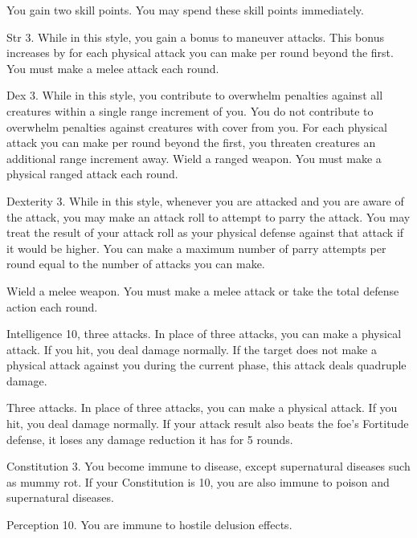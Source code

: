 \featben You gain two skill points.
You may spend these skill points immediately.

\featpre Str 3.
\featben While in this style, you gain a  bonus to maneuver attacks.
This bonus increases by  for each physical attack you can make per round beyond the first.
\stylereq You must make a melee attack each round.

\featpre Dex 3.
\featben While in this style, you contribute to overwhelm penalties against all creatures within a single range increment of you.
You do not contribute to overwhelm penalties against creatures with cover from you.
For each physical attack you can make per round beyond the first, you threaten creatures an additional range increment away.
\stylereq Wield a ranged weapon.
You must make a physical ranged attack each round.

\featpre Dexterity 3.
\featben While in this style, whenever you are attacked and you are aware of the attack, you may make an attack roll to attempt to parry the attack.
You may treat the result of your attack roll as your physical defense against that attack if it would be higher.
You can make a maximum number of parry attempts per round equal to the number of attacks you can make.

\stylereq Wield a melee weapon.
You must make a melee attack or take the total defense action each round.

\featpre Intelligence 10, three attacks.
\featben In place of three attacks, you can make a physical attack.
If you hit, you deal damage normally.
If the target does not make a physical attack against you during the current phase, this attack deals quadruple damage.

\featpre Three attacks.
\featben In place of three attacks, you can make a physical attack.
If you hit, you deal damage normally.
If your attack result also beats the foe's Fortitude defense, it loses any damage reduction it has for 5 rounds.

\featpre Constitution 3.
\featben You become immune to disease, except supernatural diseases such as mummy rot.
If your Constitution is 10, you are also immune to poison and supernatural diseases.

\featpre Perception 10.
\featben You are immune to hostile delusion effects.

